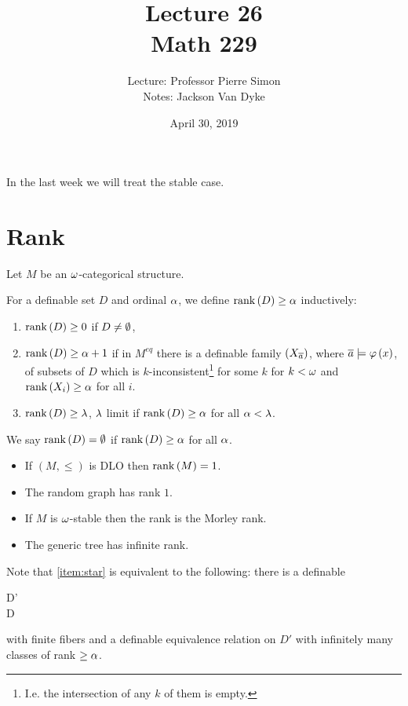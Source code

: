 \documentclass{amsart}
\begin{document}
\title{Lecture 26\\ Math 229}
\author{Lecture: Professor Pierre Simon\\ Notes: Jackson Van Dyke}
\date{April 30, 2019}
\maketitle

In the last week we will treat the stable case.

\section{Rank}

Let $M$ be an $\omega$-categorical structure. 

\begin{defn}
For a definable set $D$ and ordinal $\alpha$, we define $\operatorname{rank}\left(D\right)\geq \alpha$
inductively:
\begin{enumerate}[label = (\iii)]
\item $\operatorname{rank}\left(D\right) \geq 0$ if $D\neq \emptyset$,
\item $\operatorname{rank}\left(D\right)\geq \alpha+1$ if in $M^{eq}$ there is a definable family 
$\left(X_{\overline{a}}\right)$, where $\overline{a}\models \varphi\left(x\right)$,
of subsets of $D$ which is $k$-inconsistent\footnote{I.e. the
intersection of any $k$ of them is empty.} for some $k$ for $k < \omega$ and
$\operatorname{rank}\left(X_i\right)\geq \alpha$ for all $i$. 
\label{item:star}
\item $\operatorname{rank}\left(D\right)\geq \lambda$, $\lambda$ limit if $\operatorname{rank}\left(D\right)\geq \alpha$ for
all $\alpha < \lambda$.
\end{enumerate}
We say $\operatorname{rank}\left(D\right) = \emptyset$ if $\operatorname{rank}\left(D\right) \geq \alpha$ for all $\alpha$.
\end{defn}

\begin{exm}
\begin{itemize}
\item If $\left(M , \leq\right)$ is DLO then $\operatorname{rank}\left(M\right) = 1$.
\item The random graph has rank $1$.
\item If $M$ is $\omega$-stable then the rank is the Morley rank.
\item The generic tree has infinite rank.
\end{itemize}
\end{exm}

Note that \ref{item:star} is equivalent to the following:
there is a definable 
\begin{cd}
D'\\ D
\end{cd}
with finite fibers and a definable equivalence relation on $D'$ with infinitely many
classes of rank $\geq \alpha$.
\end{document}
